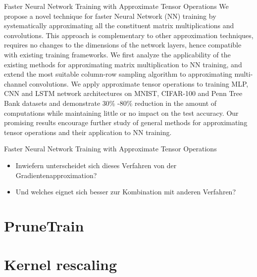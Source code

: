 \documentclass[10pt]{beamer}
\begin{document}
\begin{frame}{Faster Neural Network Training with Approximate Tensor Operations}
 We propose a novel technique for faster Neural Network (NN) training by systematically approximating all the constituent matrix multiplications and convolutions. This approach is complementary to other approximation techniques, requires no changes to the dimensions of the network layers, hence compatible with existing training frameworks. We first analyze the applicability of the existing methods for approximating matrix multiplication to NN training, and extend the most suitable column-row sampling algorithm to approximating multi-channel convolutions. We apply approximate tensor operations to training MLP, CNN and LSTM network architectures on MNIST, CIFAR-100 and Penn Tree Bank datasets and demonstrate 30\% -80\% reduction in the amount of computations while maintaining little or no impact on the test accuracy. Our promising results encourage further study of general methods for approximating tensor operations and their application to NN training.
\end{frame}

\begin{frame}{Faster Neural Network Training with Approximate Tensor Operations}
 \begin{itemize}
  \item Inwiefern unterscheidet sich dieses Verfahren von der Gradientenapproximation?
  \item Und welches eignet sich besser zur Kombination mit anderen Verfahren?
 \end{itemize}

\end{frame}


\section{PruneTrain}

\section{Kernel rescaling}
\end{document}
